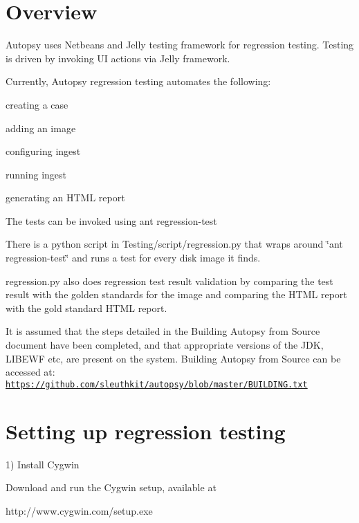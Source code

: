 \hypertarget{regression_test_page_regression_test_overview}{}\section{Overview}\label{regression_test_page_regression_test_overview}
Autopsy uses Netbeans and Jelly testing framework for regression testing. Testing is driven by invoking UI actions via Jelly framework.

Currently, Autopsy regression testing automates the following\+:


\begin{DoxyItemize}
\item creating a case
\item adding an image
\item configuring ingest
\item running ingest
\item generating an H\+T\+ML report
\end{DoxyItemize}

The tests can be invoked using ant regression-\/test

There is a python script in Testing/script/regression.\+py that wraps around \char`\"{}ant regression-\/test\char`\"{} and runs a test for every disk image it finds.

regression.\+py also does regression test result validation by comparing the test result with the golden standards for the image and comparing the H\+T\+ML report with the gold standard H\+T\+ML report.

It is assumed that the steps detailed in the Building Autopsy from Source document have been completed, and that appropriate versions of the J\+DK, L\+I\+B\+E\+WF etc, are present on the system. Building Autopsy from Source can be accessed at\+: \href{https://github.com/sleuthkit/autopsy/blob/master/BUILDING.txt}{\tt https\+://github.\+com/sleuthkit/autopsy/blob/master/\+B\+U\+I\+L\+D\+I\+N\+G.\+txt}\hypertarget{regression_test_page_regression_test_setup}{}\section{Setting up regression testing}\label{regression_test_page_regression_test_setup}
1) Install Cygwin

Download and run the Cygwin setup, available at \begin{DoxyVerb}        http://www.cygwin.com/setup.exe
\end{DoxyVerb}


